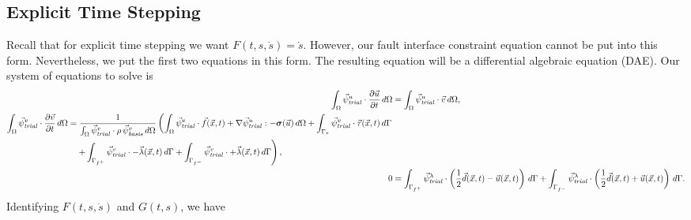 \subsection{Explicit Time Stepping}

Recall that for explicit time stepping we want
$F(t,s,\dot{s})=\dot{s}$. However, our fault interface constraint
equation cannot be put into this form. Nevertheless, we put the first
two equations in this form. The resulting equation will be a
differential algebraic equation (DAE). Our system of equations to
solve is
\begin{align}
  \int_\Omega \trialvec[u] \cdot \frac{\partial \vec{u}}{\partial t} \, d\Omega &= 
  \int_\Omega \trialvec[u] \cdot \vec{v} \, d\Omega, \\
  \begin{split}
  \int_\Omega \trialvec[v] \cdot \frac{\partial \vec{v}}{\partial t} \, d\Omega &=
  \frac{1}{\int_\Omega \trialvec[v] \cdot \rho\,\basisvec[v] \, d\Omega} \left( \int_\Omega 
  \trialvec[v] \cdot \vec{f}(\vec{x},t) + \nabla \trialvec[u] : -\tensor{\sigma}(\vec{u}) \, d\Omega
  + \int_{\Gamma_\tau} \trialvec[v] \cdot \vec{\tau}(\vec{x},t) \, d\Gamma \right. \\
  & \quad \left. + \int_{\Gamma_{f^+}} \trialvec[v] \cdot -\vec{\lambda}(\vec{x},t) \, d\Gamma
  + \int_{\Gamma_{f^-}} \trialvec[v] \cdot +\vec{\lambda}(\vec{x},t) \, d\Gamma \right) ,
  \end{split} \\
%
  0 &= \int_{\Gamma_{f^+}} \trialvec[\lambda] \cdot \left( \frac{1}{2}\vec{d}(\vec{x},t) - \vec{u}(\vec{x},t) \right) \, d\Gamma
    + \int_{\Gamma_{f^-}} \trialvec[\lambda] \cdot \left( \frac{1}{2}\vec{d}(\vec{x},t) + \vec{u}(\vec{x},t) \right) \, d\Gamma.
\end{align}
Identifying $F(t,s,\dot{s})$ and $G(t,s)$, we have
